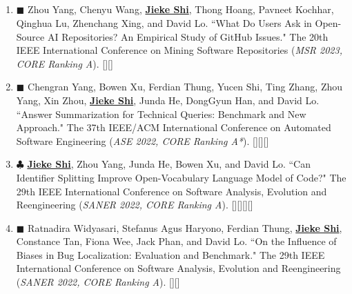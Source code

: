 \documentclass{resume}
\begin{document}
\subsection*{\textcolor{accentcolor}{}}
    \begin{enumerate}[itemsep=0.1cm]
      \item[\bracketlabel{C4}] $\mdblksquare$ Zhou Yang, Chenyu Wang, \underline{\bf{Jieke Shi}}, Thong Hoang, Pavneet Kochhar, Qinghua Lu, Zhenchang Xing, and David Lo. ``What Do Users Ask in Open-Source AI Repositories? An Empirical Study of GitHub Issues." {\itfont The 20th IEEE International Conference on Mining Software Repositories (}{\it MSR 2023, CORE Ranking A}{\itfont )}. [][]
      \item[\bracketlabel{C3}] $\mdblksquare$ Chengran Yang, Bowen Xu, Ferdian Thung, Yucen Shi, Ting Zhang, Zhou Yang, Xin Zhou, \underline{\bf{Jieke Shi}}, Junda He, DongGyun Han, and David Lo. ``Answer Summarization for Technical Queries: Benchmark and New Approach." {\itfont The 37th IEEE/ACM International Conference on Automated Software Engineering (}{\it ASE 2022, CORE Ranking A*}{\itfont )}. [][][]

      \item[\bracketlabel{S3}] $\clubsuit$ \underline{\bf{Jieke Shi}}, Zhou Yang, Junda He, Bowen Xu, and David Lo. ``Can Identifier Splitting Improve Open-Vocabulary Language Model of Code?" {\itfont The 29th IEEE International Conference on Software Analysis, Evolution and Reengineering (}{\it SANER 2022, CORE Ranking A}{\itfont )}. [][][][]

      \item[\bracketlabel{C2}] $\mdblksquare$ Ratnadira Widyasari, Stefanus Agus Haryono, Ferdian Thung, \underline{\bf{Jieke Shi}}, Constance Tan, Fiona Wee, Jack Phan, and David Lo. ``On the Influence of Biases in Bug Localization: Evaluation and Benchmark." {\itfont The 29th IEEE International Conference on Software Analysis, Evolution and Reengineering (}{\it SANER 2022, CORE Ranking A}{\itfont )}. [][]


\end{enumerate}
\end{document}
